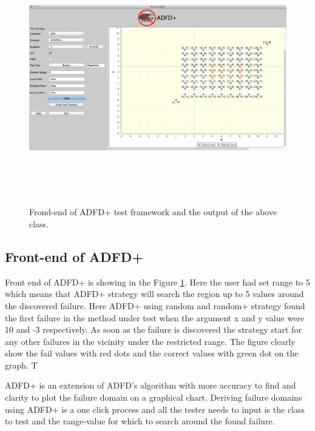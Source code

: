 \documentclass{acm_proc_article-sp}
\begin{document}
\begin{figure}[ht]
\centering
\includegraphics[width=17.5cm,height=11cm]{exampleError.png}
\caption{Frond-end of ADFD+ test framework and the output of the above class.}
\label{fig:adfdPlusFrontEnd}
\end{figure}


\subsection{Front-end of ADFD+}
Front end of ADFD+ is showing in the Figure \ref{fig:adfdPlusFrontEnd}. Here the user had set range to 5 which means that ADFD+ strategy will search the region up to 5 values around the discovered failure. Here ADFD+ using random and random+ strategy found the first failure in the method under test when the argument x and y value were 10 and -3 respectively. As soon as the failure is discovered the strategy start for any other failures in the vicinity under the restricted range. The figure clearly show the fail values with red dots and the correct values with green dot on the graph. T



ADFD+ is an extension of ADFD's algorithm with more accuracy to find and clarity to plot the failure domain on a graphical chart. Deriving failure domains using ADFD+ is a one click process and all the tester needs to input is the class to test and the range-value for which to search around the found failure. 
\end{document}
